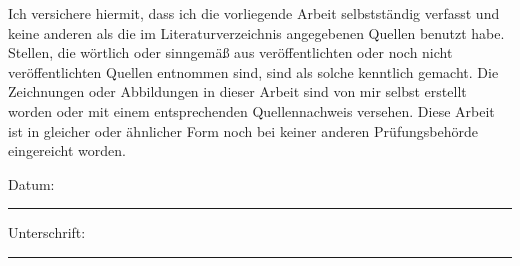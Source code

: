 \documentclass[
11pt, %
oneside, %
ngerman, %
singlespacing, %
headsepline, %
]{MastersDoctoralThesis} %
\author{Dany \textsc{Brossel}} %
\begin{document}
\frontmatter %

\pagestyle{plain} %




\begin{titlepage}

\end{titlepage}


\begin{declaration}
\vspace*{.04\textheight}
\noindent Ich versichere hiermit, dass ich die vorliegende Arbeit selbstständig verfasst und keine anderen als
die im Literaturverzeichnis angegebenen Quellen benutzt habe.\newline\newline
Stellen, die wörtlich oder sinngemäß aus veröffentlichten oder noch nicht veröffentlichten Quellen
entnommen sind, sind als solche kenntlich gemacht.\newline\newline
Die Zeichnungen oder Abbildungen in dieser Arbeit sind von mir selbst erstellt worden oder mit
einem entsprechenden Quellennachweis versehen.\newline\newline
Diese Arbeit ist in gleicher oder ähnlicher Form noch bei keiner anderen Prüfungsbehörde eingereicht
worden.\newline\newline\newline

\noindent Datum:\\
\rule[0.5em]{25em}{0.5pt} %


\noindent Unterschrift:\\
\rule[0.5em]{25em}{0.5pt} %
 
\end{declaration}

\cleardoublepage
\end{document}
